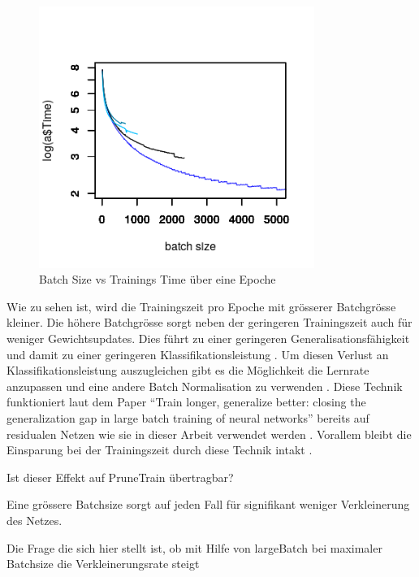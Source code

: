\begin{figure}[h]
 \centering
 \includegraphics[width=0.8\textwidth]{KapitelPartB/Images/batchSizevsTime.png}
 \caption{Batch Size vs Trainings Time über eine Epoche}
 \label{fig:batchVsTime}
\end{figure}


Wie zu sehen ist, wird die Trainingszeit pro Epoche mit grösserer Batchgrösse kleiner. Die höhere Batchgrösse sorgt neben der geringeren Trainingszeit auch für weniger Gewichtsupdates. Dies führt zu einer geringeren Generalisationsfähigkeit und damit zu einer geringeren Klassifikationsleistung \cite{largeBatch}. Um diesen Verlust an Klassifikationsleistung auszugleichen gibt es die Möglichkeit die Lernrate anzupassen und eine andere Batch Normalisation zu verwenden \cite{largeBatch}. Diese Technik funktioniert laut dem Paper "`Train longer, generalize better: closing the generalization gap in large batch training of neural networks"' bereits auf residualen Netzen wie sie in dieser Arbeit verwendet werden \cite{largeBatch}. Vorallem bleibt die Einsparung bei der Trainingszeit durch diese Technik intakt \cite{largeBatch}.

Ist dieser Effekt auf PruneTrain übertragbar?


Eine grössere Batchsize sorgt auf jeden Fall für signifikant weniger Verkleinerung des Netzes.

Die Frage die sich hier stellt ist, ob mit Hilfe von largeBatch bei maximaler Batchsize die Verkleinerungsrate steigt  


